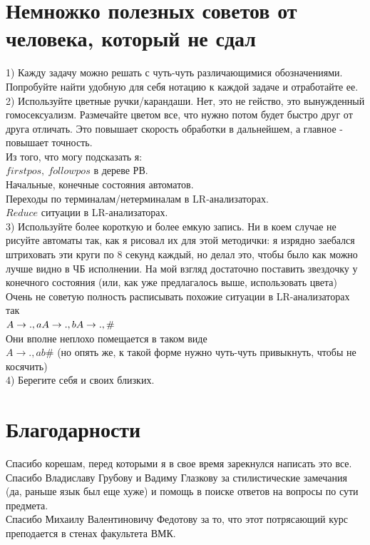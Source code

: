 \documentclass[14pt]{extreport}
\begin{document}
	\chapter{Немножко полезных советов от человека, который не сдал}
	1) Кажду задачу можно решать с чуть-чуть различающимися обозначениями. Попробуйте найти
	удобную для себя нотацию к каждой задаче и отработайте ее.\\
	2) Используйте цветные ручки/карандаши. Нет, это не гейство, это вынужденный гомосексуализм.
	Размечайте цветом все, что нужно потом будет быстро друг от друга отличать. Это повышает
	скорость обработки в дальнейшем, а главное - повышает точность.\\
	Из того, что могу подсказать я:\\
	$firstpos,\ followpos$ в дереве РВ.\\
	Начальные, конечные состояния автоматов.\\
	Переходы по терминалам/нетерминалам в LR-анализаторах.\\
	$Reduce$ ситуации в LR-анализаторах.\\
	3) Используйте более короткую и более емкую запись. Ни в коем случае не рисуйте автоматы так,
	как я рисовал их для этой методички: я изрядно заебался штриховать эти круги по 8 секунд
	каждый, но делал это, чтобы было как можно лучше видно в ЧБ исполнении. На мой взгляд
	достаточно поставить звездочку у конечного состояния (или, как уже предлагалось выше,
	использовать цвета)\\
	Очень не советую полность расписывать похожие ситуации в LR-анализаторах так\\
	$ A \to .,a \\ A \to .,b \\ A \to .,\#$\\
	Они вполне неплохо помещается в таком виде\\
	$A \to .,ab\#$ (но опять же, к такой форме нужно чуть-чуть привыкнуть, чтобы не косячить)\\
	4) Берегите себя и своих близких.
	\chapter{Благодарности}
	Спасибо корешам, перед которыми я в свое время зарекнулся написать это все.\\
	Спасибо Владиславу Грубову и Вадиму Глазкову за стилистические замечания (да, раньше
	язык был еще хуже) и помощь в поиске ответов на вопросы по сути предмета.\\
	Спасибо Михаилу Валентиновичу Федотову за то, что этот потрясающий курс преподается в
	стенах факультета ВМК.\\\\
	
	
	
	
	
	
	
\end{document}
